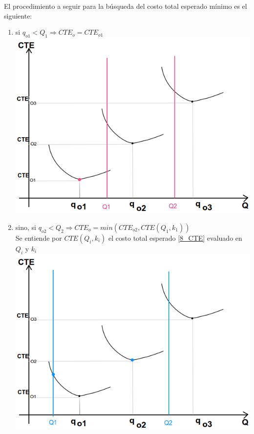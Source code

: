 \documentclass[a4paper,10pt]{article}
\begin{document}
El procedimiento a seguir para la búsqueda del costo total esperado mínimo es el siguiente: 
\begin{enumerate}
 \item si $q_{o1} < Q_1 \Rightarrow CTE_o = CTE_{o1} $ \\
    \includegraphics[scale=0.4,keepaspectratio=true]{img/8/8_QvsCTE_1.png} 
 \item sino, si $q_{o2} < Q_2 \Rightarrow CTE_o = min( CTE_{o2}, CTE(Q_1, k_1)) $ \\
      Se entiende por $CTE(Q_i, k_i)$ el costo total esperado \eqref{8_CTE} evaluado en $Q_i$ y $k_i$ \\
      \includegraphics[scale=0.4,keepaspectratio=true]{img/8/8_QvsCTE_2.png} 

\end{enumerate}
\end{document}
